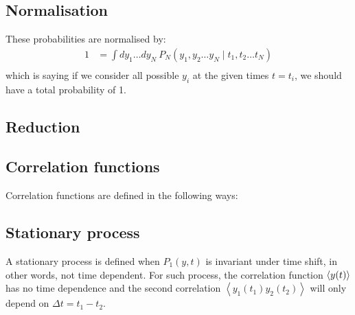 \documentclass{report}
\begin{document}
\subsection{Normalisation}
These probabilities are normalised by:
\begin{align}
    1 & =\int d y_1 \ldots d y_N \ P_N\left(y_1, y_2 \ldots y_N \mid t_1, t_2 \ldots t_N\right) \\
\end{align}
which is saying if we consider all possible $y_i$ at the given times $t=t_i$, we should have a total probability of 1.
\subsection{Reduction}
\subsection{Correlation functions}
Correlation functions are defined in the following ways:
\subsection{Stationary process}
A stationary process is defined when $P_1(y,t)$ is invariant under time shift, in other words, not time dependent. For such process, the correlation function $\langle y(t) \rangle$ has no time dependence and the second correlation $\left\langle y_1\left(t_1\right) y_2\left(t_2\right)\right\rangle$ will only depend on $\Delta t = t_1 - t_2$.
\end{document}

